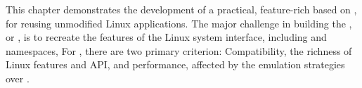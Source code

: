 This chapter
demonstrates the development of a practical, feature-rich \libos{} based on
\thehostabi{},
for reusing unmodified Linux applications.
The major challenge in building the \libos{},
or \thelibos{},
is to recreate the features of the Linux system interface, including
\linuxapis{} and namespaces, %
For \thelibos{},
there are two
primary criterion:
Compatibility, the richness of Linux features and API,
and performance, affected by
the emulation strategies over \thehostabi{}.





